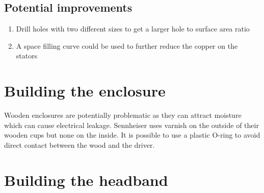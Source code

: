 \documentclass{article}
\begin{document}

\subsection{Potential improvements}
\begin{enumerate}
    \item Drill holes with two different sizes to get a larger hole to surface area ratio
    \item A space filling curve could be used to further reduce the copper on the stators
\end{enumerate}

\section{Building the enclosure}
\label{s:enclosure}
Wooden enclosures are potentially problematic as they can attract moisture which can cause electrical leakage. Sennheiser uses varnish on the outside of their wooden cups but none on the inside. It is possible to use a plastic O-ring to avoid direct contact between the wood and the driver.

\section{Building the headband}
\label{s:headband}
\end{document}
